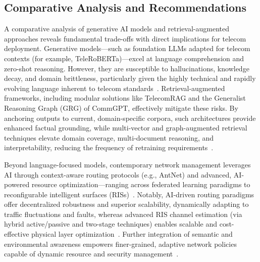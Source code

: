 \documentclass[sigconf]{acmart}
\begin{document}
\subsection{Comparative Analysis and Recommendations}

A comparative analysis of generative AI models and retrieval-augmented approaches reveals fundamental trade-offs with direct implications for telecom deployment. Generative models—such as foundation LLMs adapted for telecom contexts (for example, TeleRoBERTa)—excel at language comprehension and zero-shot reasoning. However, they are susceptible to hallucinations, knowledge decay, and domain brittleness, particularly given the highly technical and rapidly evolving language inherent to telecom standards~\cite{ref7, ref16, ref20}. Retrieval-augmented frameworks, including modular solutions like TelecomRAG and the Generalist Reasoning Graph (GRG) of CommGPT, effectively mitigate these risks. By anchoring outputs to current, domain-specific corpora, such architectures provide enhanced factual grounding, while multi-vector and graph-augmented retrieval techniques elevate domain coverage, multi-document reasoning, and interpretability, reducing the frequency of retraining requirements~\cite{ref7, ref16}.

Beyond language-focused models, contemporary network management leverages AI through context-aware routing protocols (e.g., AntNet) and advanced, AI-powered resource optimization—ranging across federated learning paradigms to reconfigurable intelligent surfaces (RISs)~\cite{ref15, ref21, ref22, ref27}. Notably, AI-driven routing paradigms offer decentralized robustness and superior scalability, dynamically adapting to traffic fluctuations and faults, whereas advanced RIS channel estimation (via hybrid active/passive and two-stage techniques) enables scalable and cost-effective physical layer optimization~\cite{ref26, ref27}. Further integration of semantic and environmental awareness empowers finer-grained, adaptive network policies capable of dynamic resource and security management~\cite{ref15, ref20, ref21, ref28}.
\end{document}
